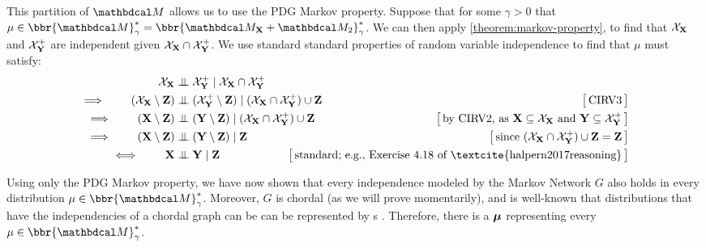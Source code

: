 \begin{subappendices}
\begin{lproof}
    This partition of $\dg M$ allows us to use the PDG Markov property.
    Suppose that for some $\gamma > 0$ that $\mu \in \bbr{\dg M}^*_\gamma = \bbr{\dg M_{\mat X} \bundle \dg M_2}^*_\gamma$.
    We can then apply \cref{theorem:markov-property}, to find that
    $\mathcal X_{\mathbf X}$ and $\mathcal X_{\mathbf Y}^+$ are independent given $\mathcal X_{\mathbf X} \cap \mathcal X_{\mathbf Y}^+$.
    We use standard standard properties of random variable independence
        \parencite[CIRV1-5 of][Theorem 4.4.4]{halpern2017reasoning} to find that $\mu$ must satisfy:
    \begin{align*}
        \XX  &\CI \XNX \mid \XX \cap \XNX\\
    \implies\qquad
        (\XX \setminus \mat Z) &\CI (\XNX\setminus \mat Z) \mid (\XX \cap \XNX) \cup \mat Z
            & \big[\,\text{CIRV3}\,\big] \\
    \implies\qquad
        (\mat X \setminus \mat Z) &\CI (\mat Y \setminus \mat Z) \mid (\XX \cap \XNX) \cup \mat Z
        & \big[\,\text{by CIRV2, as $\mat X \subseteq \XX$ and $\mat Y \subseteq \XNX$}\,\big] \\
    \implies\qquad
        (\mat X \setminus \mat Z) &\CI (\mat Y \setminus \mat Z) \mid \mat Z
        & \big[\,\text{since $(\XX \cap \XNX) \cup \mat Z = \mat Z$}\,\big] \\
    \iff\qquad
        \mat X &\CI \mat Y \mid \mat Z
        & \hspace{-4em}\big[\,\text{standard; e.g., Exercise 4.18 of \textcite{halpern2017reasoning}}\,\big] \\
    \end{align*}

    Using only the PDG Markov property, we have now shown that every independence
    modeled by the Markov Network $G$ also holds
    in every distribution $\mu \in \bbr{\dg M}^*_\gamma$. Moreover, $G$ is chordal (as we will prove momentarily),
    and is well-known that distributions that have the independencies of a chordal graph can be can be represented by \actree s \parencite[Theorem 4.12]{koller2009probabilistic}.
    Therefore, there is a \actree $\boldsymbol\mu$ representing every $\mu \in \bbr{\dg M}^*_\gamma$.


\end{lproof}
\end{subappendices}
